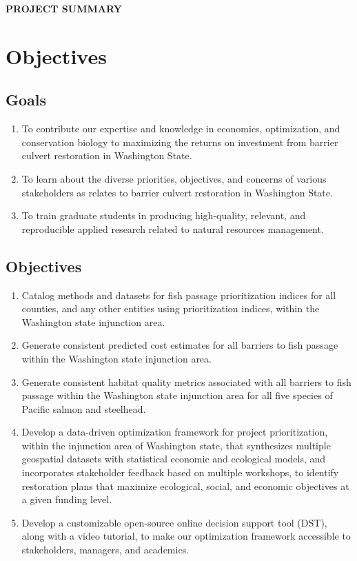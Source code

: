 \documentclass[12pt]{elsarticle}
\begin{document}
	
	\begin{center} \textbf{PROJECT SUMMARY} \end{center}
	
		\section{Objectives} 
			\subsection*{Goals}
				\begin{enumerate}
					\item To contribute our expertise and knowledge in economics, optimization, and conservation biology to maximizing the returns on investment from barrier culvert restoration in Washington State.
					\item To learn about the diverse priorities, objectives, and concerns of various stakeholders as relates to barrier culvert restoration in Washington State.
					\item To train graduate students in producing high-quality, relevant, and reproducible applied research related to natural resources management.
				\end{enumerate}
			
			\subsection*{Objectives}
				\begin{enumerate}
					\item Catalog methods and datasets for fish passage prioritization indices for all counties, and any other entities using prioritization indices, within the Washington state injunction area. 
					\item Generate consistent predicted cost estimates for all barriers to fish passage within the Washington state injunction area. 
					\item Generate consistent habitat quality metrics associated with all barriers to fish passage within the Washington state injunction area for all five species of Pacific salmon and steelhead. 
					\item Develop a data-driven optimization framework for project prioritization, within the injunction area of Washington state, that synthesizes multiple geospatial datasets with statistical economic and ecological models, and incorporates stakeholder feedback based on multiple workshops, to identify restoration plans that maximize ecological, social, and economic objectives at a given funding level.
					\item Develop a customizable open-source online decision support tool (DST), along with a video tutorial, to make our optimization framework accessible to stakeholders, managers, and academics. 
				\end{enumerate}
			
\end{document}
